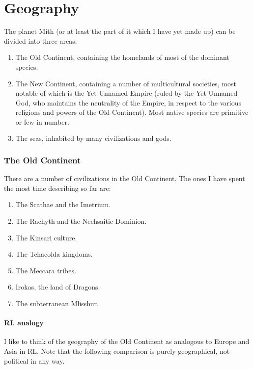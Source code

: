 \chapter{Geography}

The planet Mith (or at least the part of it which I have yet made up) can be divided into three areas:

\begin{enumerate}
\item The Old Continent, containing the homelands of most of the dominant species. 
\item The New Continent, containing a number of multicultural societies, most notable of which is the Yet Unnamed Empire (ruled by the Yet Unnamed God, who maintains the neutrality of the Empire, in respect to the various religions and powers of the Old Continent). Most native species are primitive or few in number. 
\item The seas, inhabited by many civilizations and gods.
\end{enumerate}



\subsection{The Old Continent}

There are a number of civilizations in the Old Continent. The ones I have spent the most time describing so far are:

\begin{enumerate}
\item The Scathae and the Imetrium. 
\item The Rachyth and the Nechsaitic Dominion.
\item The Kinsari culture.
\item The Tchacolda kingdoms.
\item The Meccara tribes.
\item Irokas, the land of Dragons. 
\item The subterranean Mlisshur. 
\end{enumerate}



\subsubsection{RL analogy}
I like to think of the geography of the Old Continent as analogous to Europe and Asia in RL. Note that the following comparison is purely geographical, not political in any way. 

